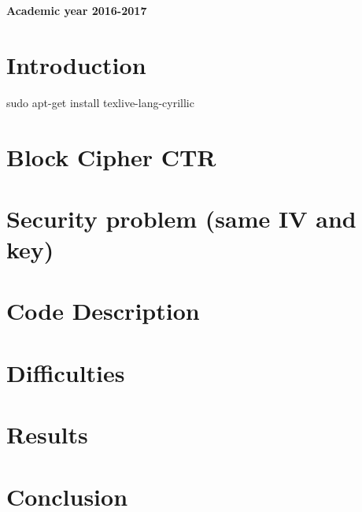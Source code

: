\documentclass[a4paper,10pt]{article}
\begin{document}
\begin{titlepage}
\begin{center}
		\textbf{Academic year 2016-2017}

        
    \end{center}
\end{titlepage}
\newpage
\tableofcontents
\pagebreak

\section{Introduction}

sudo apt-get install texlive-lang-cyrillic

\section{Block Cipher CTR}

\section{Security problem (same IV and key)}

\section{Code Description}

\section{Difficulties}

\section{Results}

\section{Conclusion}


\newpage
\end{document}
